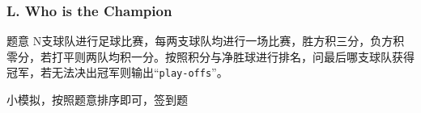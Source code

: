 \renewcommand{\problemname}{L. Who is the Champion}

\begin{frame}\frametitle{\problemname}

\begin{block}{题意}
    N支球队进行足球比赛，每两支球队均进行一场比赛，胜方积三分，负方积零分，若打平则两队均积一分。按照积分与净胜球进行排名，问最后哪支球队获得冠军，若无法决出冠军则输出``\texttt{play-offs}''。
\end{block}

小模拟，按照题意排序即可，签到题

\end{frame}
